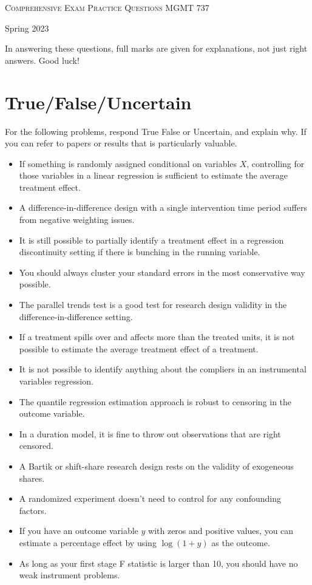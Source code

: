 \documentclass[11pt, a4paper]{article}
\begin{document}
\begin{center}
  {\Large \textsc{Comprehensive Exam Practice Questions}}
  MGMT 737
\end{center}
\begin{center}
Spring 2023
\end{center}


In answering these questions, full marks are given for explanations,
not just right answers. Good luck!


\section{True/False/Uncertain}
For the following problems, respond True False or Uncertain, and
explain why. If you can refer to papers or results that is
particularly valuable.

\begin{itemize}
\item If something is randomly assigned conditional on variables $X$,
  controlling for those variables in a linear regression is sufficient
  to estimate the average treatment effect.
\item A difference-in-difference design with a single intervention
  time period suffers from negative weighting issues.
\item It is still possible to partially identify a treatment effect in
  a regression discontinuity setting if there is bunching in the
  running variable.
\item You should always cluster your standard errors in the most
  conservative way possible.
\item The parallel trends test is a good test for research design
  validity in the difference-in-difference setting.
\item If a treatment spills over and affects more than the treated
  units, it is not possible to estimate the average treatment effect
  of a treatment.
\item It is not possible to identify anything about the compliers in
  an instrumental variables regression.
\item The quantile regression estimation approach is robust to
  censoring in the outcome variable.
\item In a duration model, it is fine to throw out observations that
  are right censored.
\item A Bartik or shift-share research design rests on the validity of
  exogeneous shares.
\item A randomized experiment doesn't need to control for any
  confounding factors.
\item If you have an outcome variable $y$ with zeros and positive
  values, you can estimate a percentage effect by using $\log(1+y)$ as
  the outcome.
\item As long as your first stage F statistic is larger than 10, you
  should have no weak instrument problems.
\end{itemize}
\end{document}
